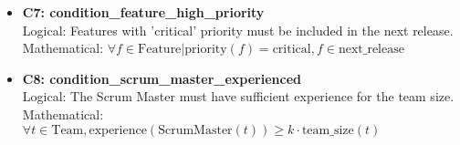 \documentclass[11pt]{article}
\begin{document}
\begin{itemize}
    \item \textbf{C7: condition\_feature\_high\_priority} \\
    Logical: Features with 'critical' priority must be included in the next release. \\
    Mathematical: $\forall f \in \text{Feature} | \text{priority}(f) = \text{critical}, f \in \text{next\_release}$
    
    \item \textbf{C8: condition\_scrum\_master\_experienced} \\
    Logical: The Scrum Master must have sufficient experience for the team size. \\
    Mathematical: $\forall t \in \text{Team}, \text{experience}(\text{ScrumMaster}(t)) \geq k \cdot \text{team\_size}(t)$
\end{itemize}
\end{document}
